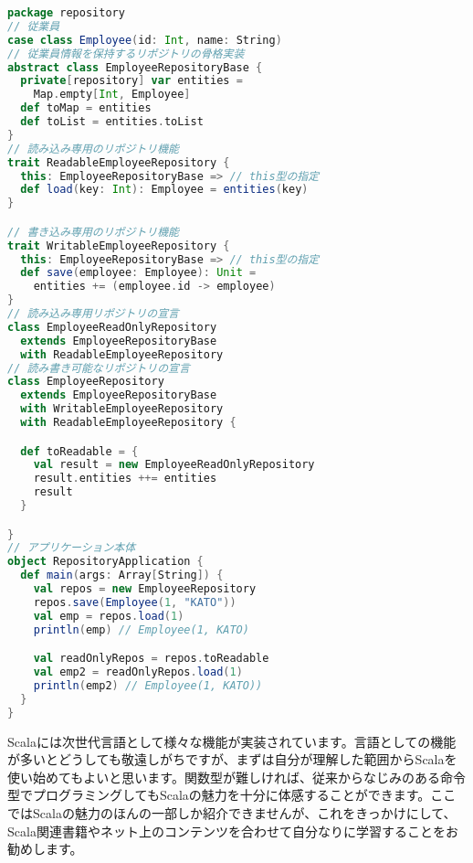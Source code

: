 \begin{lstlisting}[language=scala, label=src:trait_mixin, caption=複数のトレイトを使ったミックスインの例]
package repository
// 従業員
case class Employee(id: Int, name: String)
// 従業員情報を保持するリポジトリの骨格実装
abstract class EmployeeRepositoryBase {
  private[repository] var entities =
    Map.empty[Int, Employee]
  def toMap = entities
  def toList = entities.toList
}
// 読み込み専用のリポジトリ機能
trait ReadableEmployeeRepository {
  this: EmployeeRepositoryBase => // this型の指定
  def load(key: Int): Employee = entities(key)
}

// 書き込み専用のリポジトリ機能
trait WritableEmployeeRepository {
  this: EmployeeRepositoryBase => // this型の指定
  def save(employee: Employee): Unit =
    entities += (employee.id -> employee)
}
// 読み込み専用リポジトリの宣言
class EmployeeReadOnlyRepository
  extends EmployeeRepositoryBase
  with ReadableEmployeeRepository
// 読み書き可能なリポジトリの宣言
class EmployeeRepository
  extends EmployeeRepositoryBase
  with WritableEmployeeRepository
  with ReadableEmployeeRepository {

  def toReadable = {
    val result = new EmployeeReadOnlyRepository
    result.entities ++= entities
    result
  }

}
// アプリケーション本体
object RepositoryApplication {
  def main(args: Array[String]) {
    val repos = new EmployeeRepository
    repos.save(Employee(1, "KATO"))
    val emp = repos.load(1)
    println(emp) // Employee(1, KATO)

    val readOnlyRepos = repos.toReadable
    val emp2 = readOnlyRepos.load(1)
    println(emp2) // Employee(1, KATO))
  }
}
\end{lstlisting}

Scalaには次世代言語として様々な機能が実装されています。言語としての機能が多いとどうしても敬遠しがちですが、まずは自分が理解した範囲からScalaを使い始めてもよいと思います。関数型が難しければ、従来からなじみのある命令型でプログラミングしてもScalaの魅力を十分に体感することができます。ここではScalaの魅力のほんの一部しか紹介できませんが、これをきっかけにして、Scala関連書籍やネット上のコンテンツを合わせて自分なりに学習することをお勧めします。
